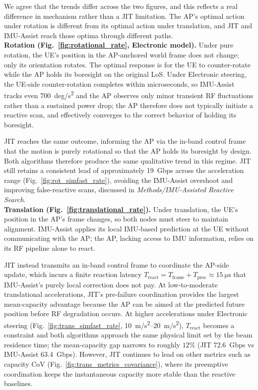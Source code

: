 \documentclass{article}
\begin{document}
\noindent We agree that the trends differ across the two figures, and this reflects a real difference in mechanism rather than a JIT limitation. The AP's optimal action under rotation is different from its optimal action under translation, and JIT and IMU-Assist reach those optima through different paths.\\

\noindent \textbf{Rotation (Fig.~\ref{fig:rotational_rate}, Electronic model).} Under pure rotation, the UE's position in the AP-anchored world frame does not change; only its orientation rotates. The optimal response is for the UE to counter-rotate while the AP holds its boresight on the original LoS. Under Electronic steering, the UE-side counter-rotation completes within microseconds, so IMU-Assist tracks even \SI{700}{deg/s^2} and the AP observes only minor transient RF fluctuations rather than a sustained power drop; the AP therefore does not typically initiate a reactive scan, and effectively converges to the correct behavior of holding its boresight. 

JIT reaches the same outcome, informing the AP via the in-band control frame that the motion is purely rotational so that the AP holds its boresight by design. Both algorithms therefore produce the same qualitative trend in this regime. JIT still retains a consistent lead of approximately \SI{19}{Gbps} across the acceleration range (Fig.~\ref{fig:rot_simfast_rate}), avoiding the IMU-Assist overshoot and improving false-reactive scans, discussed in \emph{Methods/IMU-Assisted Reactive Search}.\\

\noindent \textbf{Translation (Fig.~\ref{fig:translational_rate}).} Under translation, the UE's position in the AP's frame changes, so both nodes must steer to maintain alignment. IMU-Assist applies its local IMU-based prediction at the UE without communicating with the AP; the AP, lacking access to IMU information, relies on its RF pipeline alone to react. 

JIT instead transmits an in-band control frame to coordinate the AP-side update, which incurs a finite reaction latency $T_{\text{react}} = T_{\text{frame}} + T_{\text{proc}} \approx \SI{15}{\micro\second}$ that IMU-Assist's purely local correction does not pay. At low-to-moderate translational accelerations, JIT's pre-failure coordination provides the largest mean-capacity advantage because the AP can be aimed at the predicted future position before RF degradation occurs. At higher accelerations under Electronic steering (Fig.~\ref{fig:trans_simfast_rate}, \SIrange{10}{20}{m/s^2}), $T_{\text{react}}$ becomes a constraint and both algorithms approach the same physical limit set by the beam residence time; the mean-capacity gap narrows to roughly $12\%$ (JIT \SI{72.6}{Gbps} vs IMU-Assist \SI{63.4}{Gbps}). However, JIT continues to lead on other metrics such as capacity CoV (Fig.~\ref{fig:trans_metrics_covariance}), where its preemptive coordination keeps the instantaneous capacity more stable than the reactive baselines.
\end{document}

